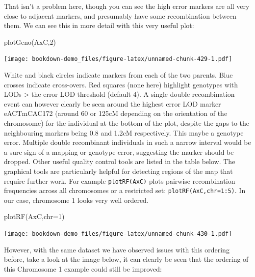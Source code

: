 \documentclass[
]{book}
\newenvironment{Shaded}{\begin{snugshade}}{\end{snugshade}}
\newcommand{\AttributeTok}[1]{\textcolor[rgb]{0.77,0.63,0.00}{#1}}
\newcommand{\DecValTok}[1]{\textcolor[rgb]{0.00,0.00,0.81}{#1}}
\newcommand{\FunctionTok}[1]{\textcolor[rgb]{0.00,0.00,0.00}{#1}}
\newcommand{\NormalTok}[1]{#1}
\begin{document}
That isn't a problem here, though you can see the high error markers are all very close to adjacent markers, and presumably have some recombination between them. We can see this in more detail with this very useful plot:

\begin{Shaded}
\begin{Highlighting}[]
\FunctionTok{plotGeno}\NormalTok{(AxC,}\DecValTok{2}\NormalTok{)}
\end{Highlighting}
\end{Shaded}

\texttt{[image: bookdown-demo\_files/figure-latex/unnamed-chunk-429-1.pdf]}

White and black circles indicate markers from each of the two parents. Blue crosses indicate cross-overs. Red squares (none here) highlight genotypes with LODs \textgreater{} the error LOD threshold (default 4). A single double recombination event can however clearly be seen around the highest error LOD marker eACTmCAC172 (around 60 or 125cM depending on the orientation of the chromosome) for the individual at the bottom of the plot, despite the gaps to the neighbouring markers being 0.8 and 1.2cM respectively. This maybe a genotype error. Multiple double recombinant individuals in such a narrow interval would be a sure sign of a mapping or genotype error, suggesting the marker should be dropped.
Other useful quality control tools are listed in the table below. The graphical tools are particularly helpful for detecting regions of the map that require further work. For example \texttt{plotRF(AxC)} plots pairwise recombination frequencies across all chromosomes or a restricted set: \texttt{plotRF(AxC,chr=1:5)}. In our case, chromosome 1 looks very well ordered.

\begin{Shaded}
\begin{Highlighting}[]
\FunctionTok{plotRF}\NormalTok{(AxC,}\AttributeTok{chr=}\DecValTok{1}\NormalTok{)}
\end{Highlighting}
\end{Shaded}

\texttt{[image: bookdown-demo\_files/figure-latex/unnamed-chunk-430-1.pdf]}

However, with the same dataset we have observed issues with this ordering before, take a look at the image below, it can clearly be seen that the ordering of this Chromosome 1 example could still be improved:
\end{document}
